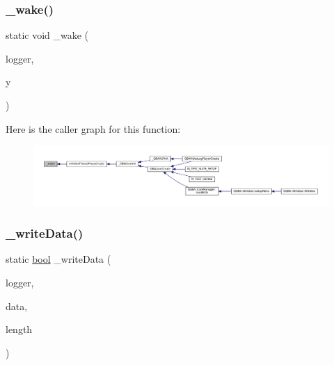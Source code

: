 \subsubsection{\texorpdfstring{\+\_\+wake()}{\_wake()}}
{\footnotesize\ttfamily static void \+\_\+wake (\begin{DoxyParamCaption}\item[{struct m\+Video\+Logger $\ast$}]{logger,  }\item[{\mbox{\hyperlink{ioapi_8h_a787fa3cf048117ba7123753c1e74fcd6}{int}}}]{y }\end{DoxyParamCaption})\hspace{0.3cm}{\ttfamily [static]}}

Here is the caller graph for this function\+:
\nopagebreak
\begin{figure}[H]
\begin{center}
\leavevmode
\includegraphics[width=350pt]{thread-proxy_8c_afb1377b4c16e0b5aa347a274d5323ec6_icgraph}
\end{center}
\end{figure}
\mbox{\label{thread-proxy_8c_a163afd173e5992530065bb8ddc2b693e}} 
\subsubsection{\texorpdfstring{\+\_\+write\+Data()}{\_writeData()}}
{\footnotesize\ttfamily static \mbox{\hyperlink{libretro_8h_a4a26dcae73fb7e1528214a068aca317e}{bool}} \+\_\+write\+Data (\begin{DoxyParamCaption}\item[{struct m\+Video\+Logger $\ast$}]{logger,  }\item[{const void $\ast$}]{data,  }\item[{size\+\_\+t}]{length }\end{DoxyParamCaption})\hspace{0.3cm}{\ttfamily [static]}}

